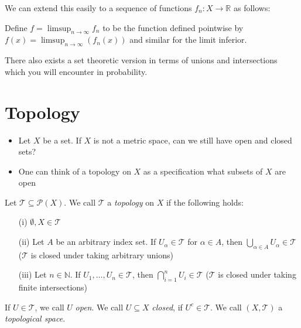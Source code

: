 \documentclass [aspectratio=169]{beamer}
\newcommand{\R}{{\mathbb{R}}}
\newcommand{\N}{{\mathbb{N}}}
\newcommand{\cP}{\mathcal{P}}
\newcommand{\cT}{\mathcal{T}}
\begin{document}
\begin{frame}
We can extend this easily to a sequence of functions $f_n \colon X \to \R$ as follows:
\vspace{0.5em}

Define $f = \limsup_{n\to \infty } f_n$ to be the function defined pointwise by $f(x) = \limsup_{n\to \infty } (f_n (x)) $ and similar for the limit inferior. 

\vspace{1em}

There also exists a set theoretic version in terms of unions and intersections which you will encounter in probability.

\end{frame}


\section{Topology}

\begin{frame}
\begin{itemize}
\item Let $X$ be a set. If $X$ is not a metric space, can we still have open and closed sets?
\item One can think of a topology on $X$ as a specification what subsets of $X$ are open
\end{itemize}

\vspace{0.5em}

\begin{definition}
Let $\cT\subseteq \cP(X)$. We call $\cT$ a \emph{topology} on $X$ if the following holds:
\begin{itemize}
    \item[(i)] $\emptyset, X \in \cT$
    \item[(ii)] Let $A$ be an arbitrary index set. If $U_\alpha \in \cT$ for $\alpha\in A$, then $\bigcup_{\alpha \in A} U_\alpha \in \cT$ ($\cT$ is closed under taking arbitrary unions)
    \item[(iii)] Let $n \in \N$. If $U_1, \ldots, U_n \in \cT$, then $\bigcap_{i=1}^n U_i \in \cT$ ($\cT$ is closed under taking finite intersections)
\end{itemize}
If $U\in \cT$, we call $U$ \emph{open}. We call $U\subseteq X$ \emph{closed}, if $U^c\in \cT$. We call $(X,\cT)$ a \emph{topological space}.
\end{definition}

\end{frame}
\end{document}
